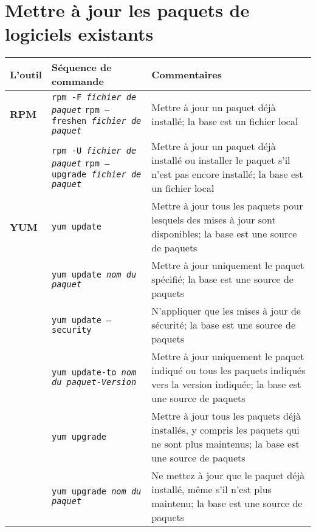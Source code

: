 \documentclass[10pt,a4paper]{article}
\newcommand{\tabellenkopf}{
  \textbf{L'outil} & \textbf{Séquence de commande} & \textbf{Commentaires} \\
}
\begin{document}
\section{Mettre à jour les paquets de logiciels existants}
\begin{tabular}{ p{3.5cm} p{9cm} p{11cm}}
  \hline
  \rowcolor{Gray}
  \tabellenkopf
  \hline 
  \textbf{RPM} & \texttt{rpm -F \textit{fichier de paquet}} \newline \texttt{rpm --freshen \textit{fichier de paquet}} & Mettre à jour un paquet déjà installé; la base est un fichier local \\
  \rowcolor{Gray}
  & \texttt{rpm -U \textit{fichier de paquet}} \newline \texttt{rpm --upgrade \textit{fichier de paquet}} & Mettre à jour un paquet déjà installé ou installer le paquet s'il n'est pas encore installé; la base est un fichier local \\
  \textbf{YUM} & \texttt{yum update} & Mettre à jour tous les paquets pour lesquels des mises à jour sont disponibles; la base est une source de paquets \\
  \rowcolor{Gray}
  & \texttt{yum update \textit{nom du paquet}} & Mettre à jour uniquement le paquet spécifié; la base est une source de paquets \\  
  & \texttt{yum update --security} & N'appliquer que les mises à jour de sécurité; la base est une source de paquets \\  
  \rowcolor{Gray}
  & \texttt{yum update-to \textit{nom du paquet-Version}} & Mettre à jour uniquement le paquet indiqué ou tous les paquets indiqués vers la version indiquée; la base est une source de paquets \\  
  & \texttt{yum upgrade} & Mettre à jour tous les paquets déjà installés, y compris les paquets qui ne sont plus maintenus; la base est une source de paquets \\  
  \rowcolor{Gray}
  & \texttt{yum upgrade \textit{nom du paquet}} & Ne mettez à jour que le paquet déjà installé, même s'il n'est plus maintenu; la base est une source de paquets \\  
  \hline
\end{tabular}

\newpage

\cheatsheet
\end{document}
